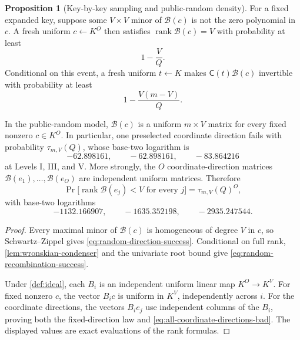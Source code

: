 \documentclass[11pt,a4paper]{article}
\theoremstyle{definition}
\newtheorem{proposition}[theorem]{Proposition}
\theoremstyle{remark}
\newcommand{\rank}{\operatorname{rank}}
\begin{document}
\begin{proposition}[Key-by-key sampling and public-random density]\label{prop:graph-direction-density}
For a fixed expanded key, suppose some $V\times V$ minor of $\mathcal B(c)$ is not the zero polynomial in $c$.  A fresh uniform $c\leftarrow K^O$ then satisfies $\rank\mathcal B(c)=V$ with probability at least
\begin{equation}\label{eq:random-direction-success}
 1-\frac{V}{Q}.
\end{equation}
Conditional on this event, a fresh uniform $t\leftarrow K$ makes
$\mathsf C(t)\mathcal B(c)$ invertible with probability at least
\begin{equation}\label{eq:random-recombination-success}
 1-\frac{V(m-V)}{Q}.
\end{equation}

In the public-random model, $\mathcal B(c)$ is a uniform $m\times V$ matrix for every fixed nonzero $c\in K^O$.  In particular, one preselected coordinate direction fails with probability $\tau_{m,V}(Q)$, whose base-two logarithm is
\[
 -62.898161,\qquad -62.898161,\qquad -83.864216
\]
at Levels I, III, and V.  More strongly, the $O$ coordinate-direction matrices
$\mathcal B(e_1),\ldots,\mathcal B(e_O)$ are independent uniform matrices.  Therefore
\begin{equation}\label{eq:all-coordinate-directions-bad}
 \Pr\bigl[\rank\mathcal B(e_j)<V\text{ for every }j\bigr]
 =\tau_{m,V}(Q)^O,
\end{equation}
with base-two logarithms
\[
 -1132.166907,\qquad-1635.352198,\qquad-2935.247544.
\]
\end{proposition}

\begin{proof}
Every maximal minor of $\mathcal B(c)$ is homogeneous of degree $V$ in $c$, so Schwartz--Zippel gives \eqref{eq:random-direction-success}.  Conditional on full rank, \cref{lem:wronskian-condenser} and the univariate root bound give \eqref{eq:random-recombination-success}.

Under \cref{def:ideal}, each $B_i$ is an independent uniform linear map $K^O\to K^V$.  For fixed nonzero $c$, the vector $B_ic$ is uniform in $K^V$, independently across $i$.  For the coordinate directions, the vectors $B_ie_j$ use independent columns of the $B_i$, proving both the fixed-direction law and \eqref{eq:all-coordinate-directions-bad}.  The displayed values are exact evaluations of the rank formulas.
\end{proof}
\end{document}
